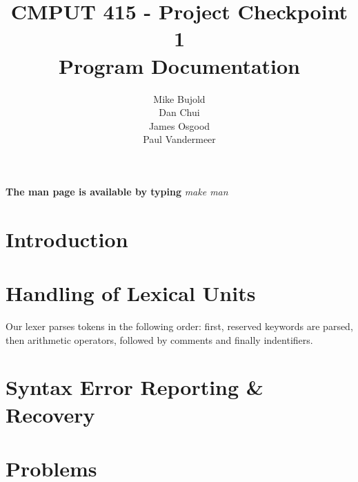 \documentclass{report}
\title{CMPUT 415 - Project Checkpoint 1\\Program Documentation}
\author{Mike Bujold \\
Dan Chui \\ 
James Osgood \\
Paul Vandermeer}
\begin{document}
\maketitle
\textbf{The man page is available by typing} \emph{make man}

\section*{Introduction}
\lipsum[1]

\section*{Handling of Lexical Units}
Our lexer parses tokens in the following order: first, reserved keywords are parsed, then arithmetic operators, followed by comments and finally indentifiers.

\section*{Syntax Error Reporting \& Recovery}
\lipsum[4-5]

\section*{Problems}
\lipsum[6]
\end{document}
